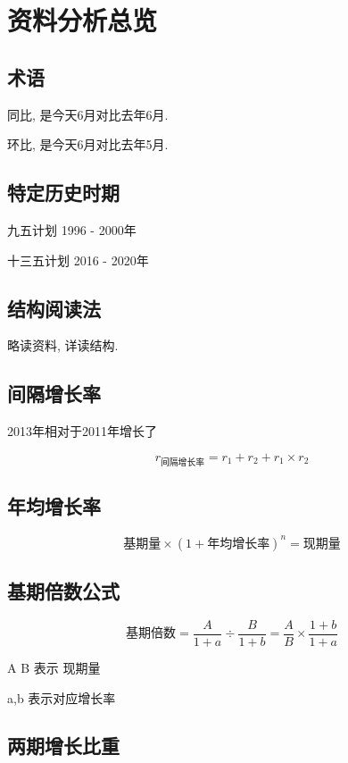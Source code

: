 \documentclass[UTF8]{ctexart}
\begin{document}
\section{资料分析总览}

\subsection{术语}
同比, 是今天6月对比去年6月.

环比, 是今天6月对比去年5月.

\subsection{特定历史时期}

九五计划 1996 - 2000年

十三五计划 2016 - 2020年

\subsection{结构阅读法}

略读资料, 详读结构.

\subsection{间隔增长率}

2013年相对于2011年增长了

$$
	r_{间隔增长率} = r_1 + r_2 + r_1 \times r_2
$$

\subsection{年均增长率}

$$
	\mbox{基期量} \times (1+\mbox{年均增长率})^n = \mbox{现期量}
$$


\subsection{基期倍数公式}

$$
	基期倍数 = \frac{A}{1+a} \div \frac{B}{1+b} = \frac{A}{B} \times \frac{1+b}{1+a}
$$

A B 表示 现期量

a,b 表示对应增长率

\subsection{两期增长比重}
\end{document}
